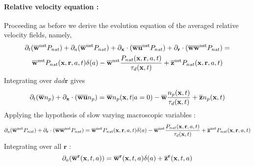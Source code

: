 \paragraph[short]{Relative velocity equation :}
Proceeding as before we derive the evolution equation of the averaged relative velocity fields, 
namely, 
\begin{multline}
    \partial_t (\overline{\textbf{w}}^\text{nst} P_{nst})
    + \partial_a (\overline{\textbf{w}}^\text{nst} P_{nst})
    + \partial_{\textbf{x}} \cdot (\overline{\textbf{w}\textbf{u} }^\text{nst} P_{nst})
    + \partial_{\textbf{r}}  \cdot (\overline{\textbf{w}\textbf{w}}^\text{nst} P_{nst})
    =  \\
    \overline{\textbf{w}}^\text{nst} P_{nst}(\textbf{x},\textbf{r},a,t)\delta(a)
    - \overline{\textbf{w}}^\text{nst}  \frac{P_{nst}(\textbf{x},\textbf{r},a,t)}{\tau_d(\textbf{x},t)}
    + \overline{\textbf{z}}^\text{nst}P_{nst}(\textbf{x},\textbf{r},a,t)
\end{multline}
Integrating over $dad\textbf{r}$ gives
\begin{equation}
    \partial_t (\overline{\textbf{w}} n_p)
    + \partial_{\textbf{x}} \cdot (\overline{\textbf{w}\textbf{u} } n_p)
    =  \\
    \overline{\textbf{w}} n_p(\textbf{x},t|a=0)
    - \overline{\textbf{w}}  \frac{n_p(\textbf{x},t)}{\tau_d(\textbf{x},t)}
    + \overline{\textbf{z}}n_p(\textbf{x},t)
\end{equation}
Applying the hypothesis of slow varying macroscopic variables : 
\begin{equation}
    \partial_a (\overline{\textbf{w}}^\text{nst} P_{nst})
    +\partial_{\textbf{r}}  \cdot (\overline{\textbf{w}\textbf{w}}^\text{nst} P_{nst})
    =  
    \overline{\textbf{w}}^\text{nst} P_{nst}(\textbf{x},\textbf{r},a,t)\delta(a)
    - \overline{\textbf{w}}^\text{nst}  \frac{P_{nst}(\textbf{x},\textbf{r},a,t)}{\tau_d(\textbf{x},t)}
    + \overline{\textbf{z}}^\text{nst}P_{nst}(\textbf{x},\textbf{r},a,t)
\end{equation}
Integrating over all $\textbf{r}$ :
\begin{equation}
    \partial_a (\overline{\textbf{w}}^{\textbf{r}}(\textbf{x},t,a))
    =  
    \overline{\textbf{w}}^{\textbf{r}}(\textbf{x},t,a)\delta(a)
    + \overline{\textbf{z}}^{\textbf{r}}(\textbf{x},t,a)
    \label{eq:da_w}
\end{equation}
 
